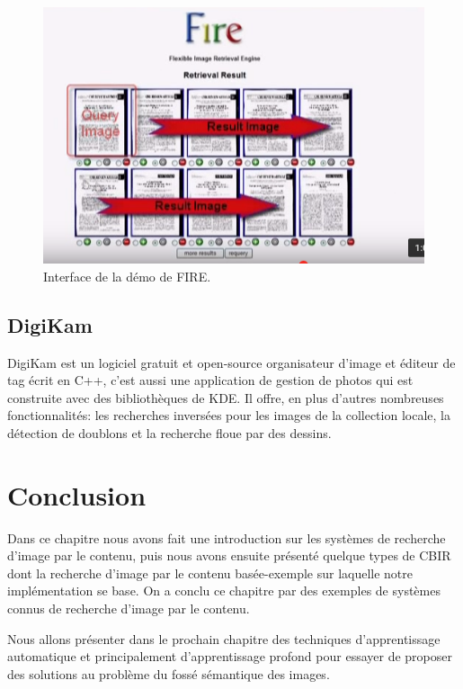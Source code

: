 \begin{figure}[H]
	\centering
		\includegraphics[width=5in]{Figures/fire-demo.png}
	\caption[An Electron]{Interface de la démo de FIRE.}
	\label{fig:Electron}
\end{figure}

\subsection*{DigiKam}
	DigiKam est un logiciel gratuit et open-source organisateur d'image et éditeur de tag écrit en C++, c'est aussi une application de gestion de photos qui est construite avec des bibliothèques de KDE. Il offre, en plus d'autres nombreuses fonctionnalités: les recherches inversées pour les images de la collection locale, la détection de doublons et la recherche floue par des dessins.





\section{Conclusion}
	
	Dans ce chapitre nous avons fait une introduction sur les systèmes de recherche d'image par le contenu, puis nous avons ensuite présenté quelque types de CBIR dont la recherche d'image par le contenu basée-exemple 
sur laquelle notre implémentation se base. On a conclu ce chapitre par des exemples de systèmes connus de recherche d'image par le contenu.

	Nous allons présenter dans le prochain chapitre des techniques d'apprentissage automatique et principalement d'apprentissage profond pour essayer de proposer des solutions au problème du fossé sémantique des images.